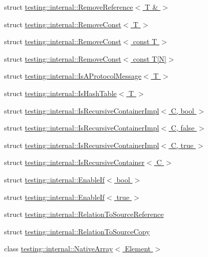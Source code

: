 \begin{DoxyCompactItemize}
struct \hyperlink{structtesting_1_1internal_1_1RemoveReference_3_01T_01_6_01_4}{testing\+::internal\+::\+Remove\+Reference$<$ T \& $>$}
\item 
struct \hyperlink{structtesting_1_1internal_1_1RemoveConst}{testing\+::internal\+::\+Remove\+Const$<$ T $>$}
\item 
struct \hyperlink{structtesting_1_1internal_1_1RemoveConst_3_01const_01T_01_4}{testing\+::internal\+::\+Remove\+Const$<$ const T $>$}
\item 
struct \hyperlink{structtesting_1_1internal_1_1RemoveConst_3_01const_01T[N]_4}{testing\+::internal\+::\+Remove\+Const$<$ const T\mbox{[}\+N\mbox{]}$>$}
\item 
struct \hyperlink{structtesting_1_1internal_1_1IsAProtocolMessage}{testing\+::internal\+::\+Is\+A\+Protocol\+Message$<$ T $>$}
\item 
struct \hyperlink{structtesting_1_1internal_1_1IsHashTable}{testing\+::internal\+::\+Is\+Hash\+Table$<$ T $>$}
\item 
struct \hyperlink{structtesting_1_1internal_1_1IsRecursiveContainerImpl}{testing\+::internal\+::\+Is\+Recursive\+Container\+Impl$<$ C, bool $>$}
\item 
struct \hyperlink{structtesting_1_1internal_1_1IsRecursiveContainerImpl_3_01C_00_01false_01_4}{testing\+::internal\+::\+Is\+Recursive\+Container\+Impl$<$ C, false $>$}
\item 
struct \hyperlink{structtesting_1_1internal_1_1IsRecursiveContainerImpl_3_01C_00_01true_01_4}{testing\+::internal\+::\+Is\+Recursive\+Container\+Impl$<$ C, true $>$}
\item 
struct \hyperlink{structtesting_1_1internal_1_1IsRecursiveContainer}{testing\+::internal\+::\+Is\+Recursive\+Container$<$ C $>$}
\item 
struct \hyperlink{structtesting_1_1internal_1_1EnableIf}{testing\+::internal\+::\+Enable\+If$<$ bool $>$}
\item 
struct \hyperlink{structtesting_1_1internal_1_1EnableIf_3_01true_01_4}{testing\+::internal\+::\+Enable\+If$<$ true $>$}
\item 
struct \hyperlink{structtesting_1_1internal_1_1RelationToSourceReference}{testing\+::internal\+::\+Relation\+To\+Source\+Reference}
\item 
struct \hyperlink{structtesting_1_1internal_1_1RelationToSourceCopy}{testing\+::internal\+::\+Relation\+To\+Source\+Copy}
\item 
class \hyperlink{classtesting_1_1internal_1_1NativeArray}{testing\+::internal\+::\+Native\+Array$<$ Element $>$}

\end{DoxyCompactItemize}
